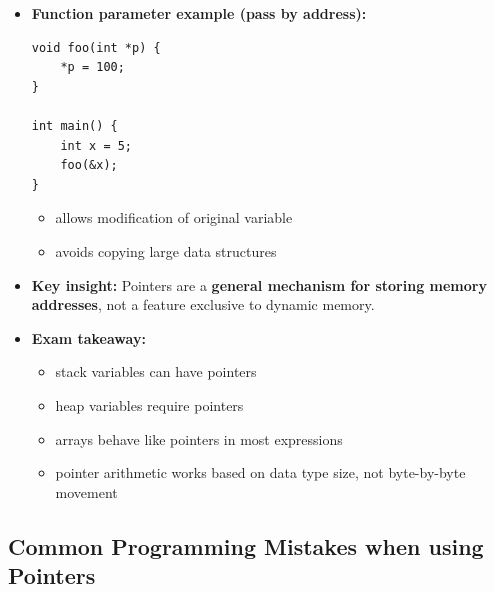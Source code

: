 \documentclass[10pt]{article}
\begin{document}
\begin{itemize}
\item \textbf{Function parameter example (pass by address):}
\begin{verbatim}
void foo(int *p) {
    *p = 100;
}

int main() {
    int x = 5;
    foo(&x);
}
\end{verbatim}

\begin{itemize}
    \item allows modification of original variable
    \item avoids copying large data structures
\end{itemize}

\item \textbf{Key insight:}
Pointers are a \textbf{general mechanism for storing memory addresses}, not a feature exclusive to dynamic memory.

\item \textbf{Exam takeaway:}
\begin{itemize}
    \item stack variables can have pointers
    \item heap variables require pointers
    \item arrays behave like pointers in most expressions
    \item pointer arithmetic works based on data type size, not byte-by-byte movement
\end{itemize}

\end{itemize}

\newpage

\subsection{Common Programming Mistakes when using Pointers}
\end{document}
